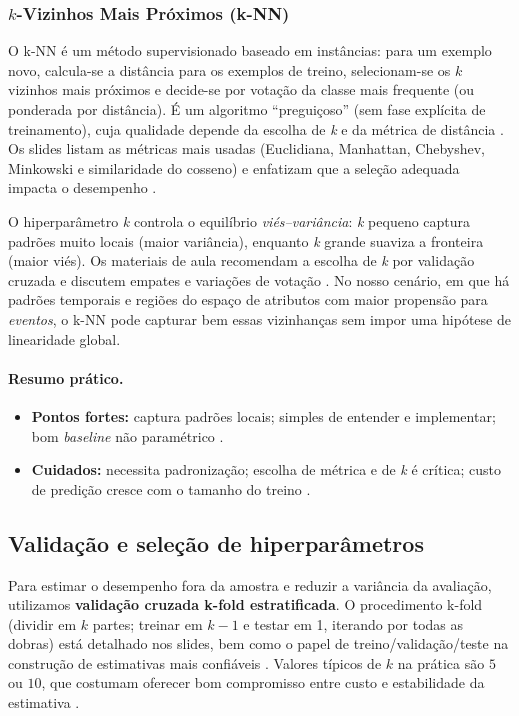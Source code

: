 \documentclass[12pt,oneside]{abntex2}
\begin{document}
\subsubsection*{\texorpdfstring{$k$-Vizinhos Mais Próximos (k-NN)}{k-Vizinhos Mais Próximos (k-NN)}}
O k-NN é um método supervisionado baseado em instâncias: para um exemplo novo, calcula-se a distância para os exemplos de treino,
selecionam-se os $k$ vizinhos mais próximos e decide-se por votação da classe mais frequente (ou ponderada por distância).
É um algoritmo ``preguiçoso'' (sem fase explícita de treinamento), cuja qualidade depende da escolha de \emph{k} e da métrica de distância
\cite{naozuka_knn_2025}. Os slides listam as métricas mais usadas (Euclidiana, Manhattan, Chebyshev, Minkowski e similaridade do cosseno)
e enfatizam que a seleção adequada impacta o desempenho \cite{naozuka_knn_2025}.

O hiperparâmetro \emph{k} controla o equilíbrio \emph{viés--variância}: \emph{k} pequeno captura padrões muito locais (maior variância),
enquanto \emph{k} grande suaviza a fronteira (maior viés). Os materiais de aula recomendam a escolha de \emph{k} por validação cruzada
e discutem empates e variações de votação \cite{naozuka_knn_2025}. No nosso cenário, em que há padrões temporais e regiões do espaço de atributos
com maior propensão para \emph{eventos}, o k-NN pode capturar bem essas vizinhanças sem impor uma hipótese de linearidade global.

\paragraph*{Resumo prático.}
\begin{itemize}
  \item \textbf{Pontos fortes:} captura padrões locais; simples de entender e implementar; bom \emph{baseline} não paramétrico \cite{naozuka_knn_2025}.
  \item \textbf{Cuidados:} necessita padronização; escolha de métrica e de \emph{k} é crítica; custo de predição cresce com o tamanho do treino \cite{naozuka_knn_2025}.
\end{itemize}

\subsection*{Validação e seleção de hiperparâmetros}
Para estimar o desempenho fora da amostra e reduzir a variância da avaliação, utilizamos \textbf{validação cruzada k-fold estratificada}.
O procedimento k-fold (dividir em $k$ partes; treinar em $k{-}1$ e testar em 1, iterando por todas as dobras) está detalhado nos slides,
bem como o papel de treino/validação/teste na construção de estimativas mais confiáveis \cite{naozuka_metricas_2025}.
Valores típicos de $k$ na prática são $5$ ou $10$, que costumam oferecer bom compromisso entre custo e estabilidade da estimativa
\cite{naozuka_metricas_2025}.
\end{document}
